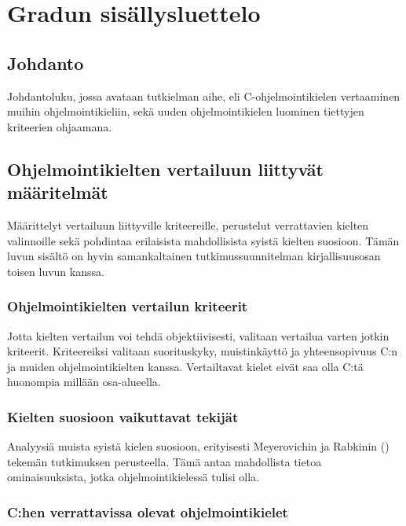 \section{Gradun sisällysluettelo}

\subsection{Johdanto}

Johdantoluku, jossa avataan tutkielman aihe, eli C-ohjelmointikielen
vertaaminen muihin ohjelmointikieliin, sekä uuden ohjelmointikielen luominen
tiettyjen kriteerien ohjaamana.

\subsection{Ohjelmointikielten vertailuun liittyvät määritelmät}

Määrittelyt vertailuun liittyville kriteereille, perustelut verrattavien
kielten valinnoille sekä pohdintaa erilaisista mahdollisista syistä kielten
suosioon. Tämän luvun sisältö on hyvin samankaltainen tutkimussuunnitelman
kirjallisuusosan toisen luvun kanssa.

\subsubsection{Ohjelmointikielten vertailun kriteerit}

Jotta kielten vertailun voi tehdä objektiivisesti, valitaan vertailua varten
jotkin kriteerit. Kriteereiksi valitaan suorituskyky, muistinkäyttö ja
yhteensopivuus C:n ja muiden ohjelmointikielten kanssa. Vertailtavat kielet
eivät saa olla C:tä huonompia millään osa-alueella.

\subsubsection{Kielten suosioon vaikuttavat tekijät}

Analyysiä muista syistä kielen suosioon, erityisesti Meyerovichin ja Rabkinin
(\citeyear{empiricalpopularity}) tekemän tutkimuksen perusteella. Tämä antaa
mahdollista tietoa ominaisuuksista, jotka ohjelmointikielessä tulisi olla.

\subsubsection{C:hen verrattavissa olevat ohjelmointikielet}

